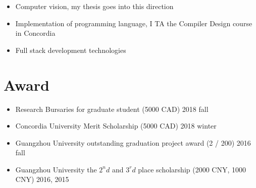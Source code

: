 \documentclass[11pt,a4paper,sans]{moderncv}
\begin{document}
\begin{itemize}
\item Computer vision, my thesis goes into this direction
\vspace{1pt}

\item Implementation of programming language, I TA the Compiler Design course in Concordia
\vspace{1pt}

\item Full stack development technologies
\vspace{1pt}

\end{itemize}

\section{Award}

\begin{itemize}

\item Research Bursaries for graduate student (5000 CAD) \hfill 2018 fall
\vspace{1pt}

\item Concordia University Merit Scholarship (5000 CAD) \hfill 2018 winter
\vspace{1pt}

\item Guangzhou University outstanding graduation project award (2 / 200) \hfill 2016 fall
\vspace{1pt}

\item Guangzhou University the $2^nd$ and $3^rd$ place scholarship (2000 CNY, 1000 CNY) \hfill 2016, 2015
\vspace{1pt}

\end{itemize}

\end{document}
